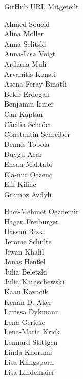 \documentclass{beamer}
\begin{document}
\begin{frame}{GitHub URL Mitgeteilt}
	
	\footnotesize
	\fboxsep=0pt
	\noindent%
		\begin{minipage}[t]{0.30\linewidth}
			Ahmed Soueid \\
			Alina Möller \\
			Anna Selitski \\
			Anna-Lisa Voigt \\
			Ardiana Muli \\
			Arvanitis Konsti\\
			Asena-Feray Binatli \\
			Bekir Erdogan \\
			Benjamin Irmer \\
			Can Kaptan \\
			Cäcilia Schröer \\
			Constantin Schreiber \\
			Dennis Tobola \\
			Duygu Acar \\
			Ehsan Maktabi\\ 
			Ela-nur Oezenc \\
			Elif Kilinc \\
			Gramoz Avdyli \\
		\end{minipage}%
	\hfill%
		\begin{minipage}[t]{0.30\linewidth}
			Haci-Mehmet Oezdemir \\
			Hagen Freiburger\\
			Hassan Rizk \\
			Jerome Schulte\\
			Jiwan Khalil\\
			Jonas Henßel\\
			Julia Beletzki\\
			Julia Karaschewski\\
			Kaan Kavacik\\
			Kenan D. Aker\\
			Larissa Dykmann\\
			Lena Gericke\\
			Lena-Maria Krick\\
			Lennard Stittgen\\
			Linda Khorami\\
			Lisa Klingsporn\\
			Lisa Lindemaier\\
		\end{minipage}
	\hfill%
		\begin{minipage}[t]{0.30\linewidth}

\end{minipage}
\end{frame}
\end{document}

